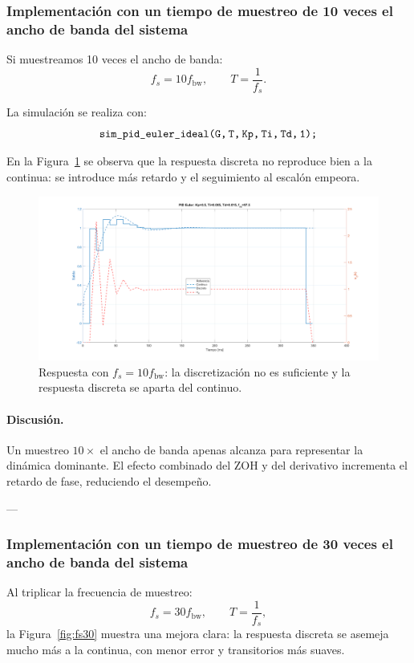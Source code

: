 \subsubsection{ Implementación con un tiempo de muestreo de 10 veces el ancho de banda del sistema
}


Si muestreamos 10 veces el ancho de banda:
\[
f_s = 10 f_{\mathrm{bw}}, \qquad T = \frac{1}{f_s}.
\]

La simulación se realiza con:
\[
\texttt{sim\_pid\_euler\_ideal(G,\,T,\,Kp,\,Ti,\,Td,\,1);}
\]

En la Figura~\ref{fig:fs10} se observa que la respuesta discreta no reproduce bien a la continua: se introduce más retardo y el seguimiento al escalón empeora.

\begin{figure}[!t]
	\centering
	\includegraphics[width=\columnwidth]{img/fs10.png}
	\caption{Respuesta con $f_s=10 f_{\mathrm{bw}}$: la discretización no es suficiente y la respuesta discreta se aparta del continuo.}
	\label{fig:fs10}
\end{figure}

\paragraph{Discusión.} Un muestreo $10\times$ el ancho de banda apenas alcanza para representar la dinámica dominante. El efecto combinado del ZOH y del derivativo incrementa el retardo de fase, reduciendo el desempeño.  

---

\subsubsection{ Implementación con un tiempo de muestreo de 30 veces el ancho de banda del sistema
}

Al triplicar la frecuencia de muestreo:
\[
f_s = 30 f_{\mathrm{bw}}, \qquad T = \frac{1}{f_s},
\]
la Figura~\ref{fig:fs30} muestra una mejora clara: la respuesta discreta se asemeja mucho más a la continua, con menor error y transitorios más suaves.


